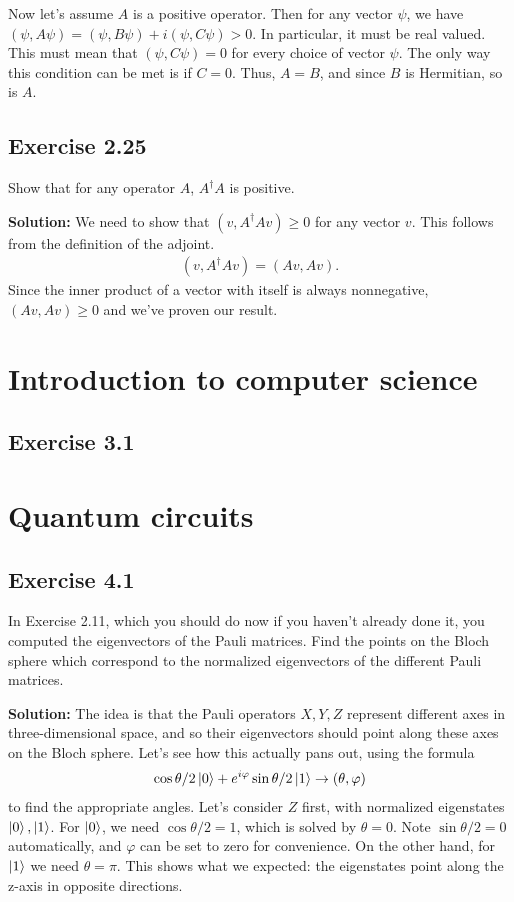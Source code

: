 \documentclass{book}
\begin{document}
    Now let's assume $A$ is a positive operator. Then for any vector $\psi$, we have $(\psi, A \psi) = (\psi, B\psi) + i (\psi, C\psi) > 0$. In particular, it must be real valued. This must mean that $(\psi, C\psi) = 0$ for every choice of vector $\psi$. The only way this condition can be met is if $C= 0$. Thus, $A = B$, and since $B$ is Hermitian, so is $A$.
    
\section*{Exercise 2.25}
    Show that for any operator $A$, $A^\dagger A$ is positive.
    
    \textbf{Solution:} We need to show that $(v, A^\dagger A v) \geq 0$ for any vector $v$. This follows from the definition of the adjoint.
    \begin{align}
        (v, A^\dagger A v) = (A v, A v).
    \end{align}
    Since the inner product of a vector with itself is always nonnegative, $(A v, A v) \geq 0$ and we've proven our result.
\chapter{Introduction to computer science}

\section*{Exercise 3.1}

\chapter{Quantum circuits}

\section*{Exercise 4.1}
    In Exercise 2.11, which you should do now if you haven’t already done it, you computed the eigenvectors of the Pauli matrices. Find the points on the Bloch sphere which correspond to the normalized eigenvectors of the different Pauli matrices.
    
    \textbf{Solution:} The idea is that the Pauli operators $X, Y, Z$ represent different axes in three-dimensional space, and so their eigenvectors should point along these axes on the Bloch sphere. Let's see how this actually pans out, using the formula
    \begin{align} \label{eq:ket2bloch}
        \cos\theta/2 \ket{0} + e^{i\varphi}\sin\theta/2 \ket{1} \rightarrow (\theta, \varphi)
    \end{align}
    to find the appropriate angles. Let's consider $Z$ first, with normalized eigenstates $\ket{0}, \ket{1}$. For $\ket{0}$, we need $\cos\theta/2 = 1$, which is solved by $\theta = 0$. Note $\sin\theta/2 = 0$ automatically, and $\varphi$ can be set to zero for convenience. On the other hand, for $\ket{1}$ we need $\theta = \pi$. This shows what we expected: the eigenstates point along the z-axis in opposite directions.
    
\end{document}
